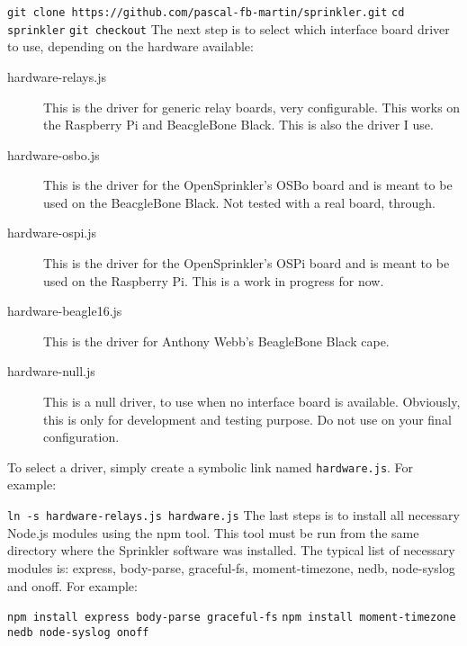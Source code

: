 \documentclass[11pt]{book}
\begin{document}
\indent\texttt{git clone https://github.com/pascal-fb-martin/sprinkler.git}
\linebreak
\indent\texttt{cd sprinkler}
\linebreak
\indent\texttt{git checkout}
\linebreak
The next step is to select which interface board driver to use, depending on the hardware available:
\begin{description}
\item[hardware-relays.js] This is the driver for generic relay boards, very configurable. This works on the Raspberry Pi and BeacgleBone Black. This is also the driver I use.
\item[hardware-osbo.js] This is the driver for the OpenSprinkler's OSBo board and is meant to be used on the BeacgleBone Black. Not tested with a real board, through.
\item[hardware-ospi.js] This is the driver for the OpenSprinkler's OSPi board and is meant to be used on the Raspberry Pi. This is a work in progress for now.
\item[hardware-beagle16.js] This is the driver for Anthony Webb's BeagleBone Black cape.
\item[hardware-null.js] This is a null driver, to use when no interface board is available. Obviously, this is only for development and testing purpose. Do not use on your final configuration.
\end{description}
To select a driver, simply create a symbolic link named \texttt{hardware.js}. For example:

\indent\texttt{ln -s hardware-relays.js hardware.js}
\linebreak
The last steps is to install all necessary Node.js modules using the npm tool. This tool must be run from the same directory where the Sprinkler software was installed. The typical list of necessary modules is: express, body-parse, graceful-fs,  moment-timezone,  nedb,  node-syslog and onoff. For example:

\indent\texttt{npm install express body-parse graceful-fs}
\linebreak
\indent\texttt{npm install moment-timezone nedb node-syslog onoff}
\linebreak
\end{document}
